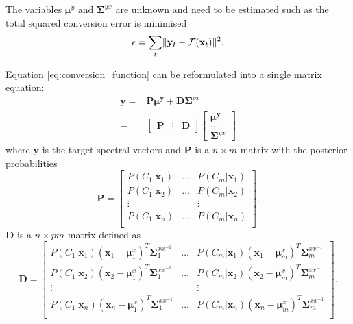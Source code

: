 The variables $\boldsymbol{\mu}^y$ and $\mathbf{\Sigma}^{yx}$ are unknown and need to be estimated such as the total squared conversion error is minimised
\begin{equation}
	\label{eq:conversion_error}
	\epsilon = \sum_{t} \lVert\mathbf{y}_t - \mathcal{F}(\mathbf{x}_t)\rVert^2.
\end{equation}

Equation \eqref{eq:conversion_function} can be reformulated into a single matrix equation:
\begin{equation}
	\label{eq:least_square_problem}
	\begin{split}
		\mathbf{y} = &\mathbf{P}\boldsymbol{\mu^y} + \mathbf{D}\mathbf{\Sigma}^{yx} \\
		= & \begin{bmatrix}
			\mathbf{P}& \vdots &\mathbf{D}
		\end{bmatrix}
		\begin{bmatrix}
			\boldsymbol{\mu^y} \\
			\dots \\
			\mathbf{\Sigma}^{yx}
		\end{bmatrix}
	\end{split}
\end{equation}
where $\mathbf{y}$ is the target spectral vectors and $\mathbf{P}$ is a $n \times m$ matrix with the posterior probabilities
\begin{equation}
	\label{eq:P_matrix}
	\mathbf{P} = \begin{bmatrix}
		P(C_1\vert \mathbf{x}_1) & \dots & P(C_m\vert \mathbf{x}_1) \\
		P(C_1\vert \mathbf{x}_2) & \dots & P(C_m\vert \mathbf{x}_2) \\
		\vdots & & \vdots \\
		P(C_1\vert \mathbf{x}_n) & \dots & P(C_m\vert \mathbf{x}_n) \\
	\end{bmatrix}.
\end{equation}
$\mathbf{D}$ is a $n \times pm$ matrix defined as
\begin{equation}
	\label{eq:D_matrix}
	\mathbf{D} = \begin{bmatrix}
		P(C_1\vert \mathbf{x}_1)(\mathbf{x}_1 - \boldsymbol{\mu}_1^x)^T\mathbf{\Sigma}_1^{xx^{-1}} & \dots & P(C_m\vert \mathbf{x}_1)(\mathbf{x}_1 - \boldsymbol{\mu}_m^x)^T\mathbf{\Sigma}_m^{xx^{-1}} \\
		P(C_1\vert \mathbf{x}_2)(\mathbf{x}_2 - \boldsymbol{\mu}_1^x)^T\mathbf{\Sigma}_1^{xx^{-1}} & \dots & P(C_m\vert \mathbf{x}_2)(\mathbf{x}_2 - \boldsymbol{\mu}_m^x)^T\mathbf{\Sigma}_m^{xx^{-1}} \\
		\vdots & & \vdots \\
		P(C_1\vert \mathbf{x}_n)(\mathbf{x}_n - \boldsymbol{\mu}_1^x)^T\mathbf{\Sigma}_1^{xx^{-1}} & \dots & P(C_m\vert \mathbf{x}_n)(\mathbf{x}_n - \boldsymbol{\mu}_m^x)^T\mathbf{\Sigma}_m^{xx^{-1}} \\
	\end{bmatrix}.
\end{equation}

